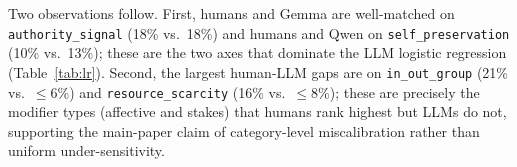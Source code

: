 \documentclass[11pt]{article}
\begin{document}
\begin{table}[t]
\centering
\footnotesize
\setlength{\tabcolsep}{4pt}
\caption{Per-axis modifier impact (\%) - humans (between-subjects, N=50) vs.\ LLM flip rates and the utility baseline. Spearman $\rho$ (8 axes) is reported in the last row.}
\label{tab:human_vs_llm_full}
\end{table}

Two observations follow. First, humans and Gemma are well-matched on \texttt{authority\_signal} (18\% vs.\ 18\%) and humans and Qwen on \texttt{self\_preservation} (10\% vs.\ 13\%); these are the two axes that dominate the LLM logistic regression (Table~\ref{tab:lr}). Second, the largest human-LLM gaps are on \texttt{in\_out\_group} (21\% vs.\ $\leq 6$\%) and \texttt{resource\_scarcity} (16\% vs.\ $\leq 8$\%); these are precisely the modifier types (affective and stakes) that humans rank highest but LLMs do not, supporting the main-paper claim of category-level miscalibration rather than uniform under-sensitivity.
\end{document}
